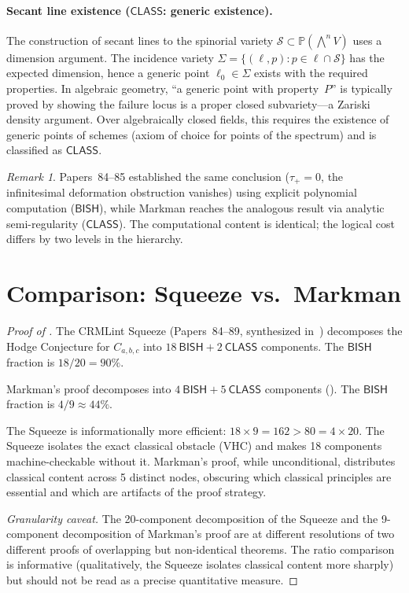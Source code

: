 \documentclass[11pt]{article}
\theoremstyle{plain}
\theoremstyle{definition}
\theoremstyle{remark}
\newtheorem{remark}[theorem]{Remark}
\newcommand{\PP}{\mathbb{P}}
\newcommand{\BISH}{\mathsf{BISH}}
\newcommand{\CLASS}{\mathsf{CLASS}}
\begin{document}
\paragraph{Secant line existence ($\CLASS$: generic existence).}
The construction of secant lines to the spinorial variety
$\mathcal{S} \subset \PP(\bigwedge^n V)$ uses a dimension argument.
The incidence variety
$\Sigma = \{(\ell, p) : p \in \ell \cap \mathcal{S}\}$
has the expected dimension, hence a generic point
$\ell_0 \in \Sigma$ exists with the required properties.  In
algebraic geometry, ``a generic point with property~$P$'' is
typically proved by showing the failure locus is a proper closed
subvariety---a Zariski density argument.  Over algebraically closed
fields, this requires the existence of generic points of schemes
(axiom of choice for points of the spectrum) and is classified as
$\CLASS$.

\begin{remark}
Papers~84--85 established the same conclusion
($\tau_+ = 0$, the infinitesimal deformation obstruction vanishes)
using explicit polynomial computation ($\BISH$), while
Markman reaches the analogous result via analytic semi-regularity
($\CLASS$).  The computational content is identical; the logical
cost differs by two levels in the hierarchy.
\end{remark}

\section{Comparison: Squeeze vs.\ Markman}\label{sec:comparison}

\begin{proof}[Proof of ]
The CRMLint Squeeze (Papers~84--89, synthesized in~\cite{p90})
decomposes the Hodge Conjecture for $C_{a,b,c}$ into
$18~\BISH + 2~\CLASS$ components.  The $\BISH$ fraction is
$18/20 = 90\%$.

Markman's proof decomposes into $4~\BISH + 5~\CLASS$ components
().  The $\BISH$ fraction is $4/9 \approx 44\%$.

The Squeeze is informationally more efficient:
$18 \times 9 = 162 > 80 = 4 \times 20$.  The Squeeze isolates the
exact classical obstacle (VHC) and makes 18 components
machine-checkable without it.  Markman's proof, while unconditional,
distributes classical content across 5 distinct nodes,
obscuring which classical principles are essential and which are
artifacts of the proof strategy.

\emph{Granularity caveat.}  The 20-component decomposition of the
Squeeze and the 9-component decomposition of Markman's proof are at
different resolutions of two different proofs of overlapping but
non-identical theorems.  The ratio comparison is informative
(qualitatively, the Squeeze isolates classical content more sharply)
but should not be read as a precise quantitative measure.
\end{proof}
\end{document}
